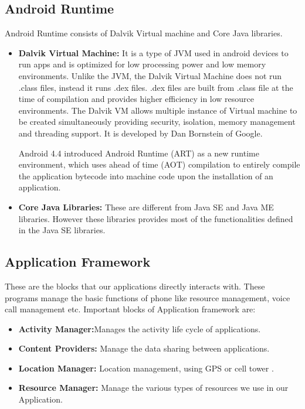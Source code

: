 \subsection{Android Runtime}

Android Runtime consists of Dalvik Virtual machine and Core Java libraries. 

\begin{itemize}

	\item \textbf{Dalvik Virtual Machine:}  It is a type of JVM used in android devices to run apps and is optimized for low processing power and low memory environments. Unlike the JVM, the Dalvik Virtual Machine does not run .class files, instead it runs .dex files. .dex files are built from .class file at the time of compilation and provides higher efficiency in low resource environments. The Dalvik VM allows multiple instance of Virtual machine to be created simultaneously providing security, isolation, memory management and threading support. It is developed by Dan Bornstein of Google. 

	Android 4.4 introduced Android Runtime (ART) as a new runtime environment, which uses ahead of time (AOT) compilation to entirely compile the application bytecode into machine code upon the installation of an application.

	

	\item \textbf{Core Java Libraries:} These are different from Java SE and Java ME libraries. However these libraries provides most of the functionalities defined in the Java SE libraries.

\end{itemize}

\subsection{Application Framework}

These are the blocks that our applications directly interacts with. These programs manage the basic functions of phone like resource management, voice call management etc.  Important blocks of Application framework are:

\begin{itemize}

\item \textbf{Activity Manager:}Manages the activity life cycle of applications.

\item \textbf{Content Providers:} Manage the data sharing between applications.

\item \textbf{Location Manager:} Location management, using GPS or cell tower .

\item \textbf{Resource Manager:} Manage the various types of resources we use in our Application.



\end{itemize}






